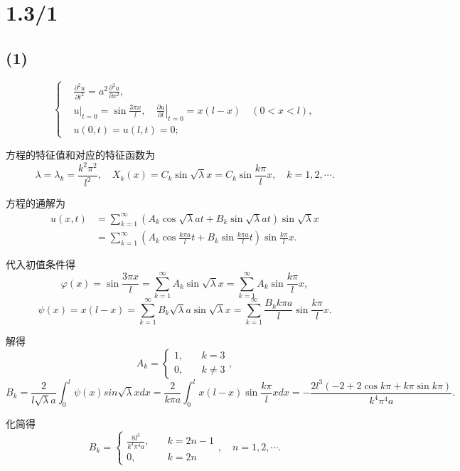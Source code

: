 \documentclass[11pt,a4paper]{article}
\author{刘逸灏 (515370910207)}
\begin{document}
\maketitle

\section{1.3/1}

\subsection*{(1)}

$$
  \left\{\begin{aligned}
     & \frac{\partial^2u}{\partial t^2}=a^2\frac{\partial^2u}{\partial x^2},                                      \\
     & u|_{t=0}=\sin\frac{3\pi x}{l},\quad \left.\frac{\partial u}{\partial t}\right|_{t=0}=x(l-x) \quad (0<x<l), \\
     & u(0,t)=u(l,t)=0;
  \end{aligned}\right.
$$

方程的特征值和对应的特征函数为
$$\lambda=\lambda_k=\frac{k^2\pi^2}{l^2},\quad X_k(x)=C_k\sin\sqrt{\lambda}x=C_k\sin\frac{k\pi}{l}x,\quad k=1,2,\cdots.$$

方程的通解为
\begin{align*}
  u(x,t)
   & =\sum_{k=1}^\infty\left(A_k\cos\sqrt{\lambda}at+
  B_k\sin\sqrt{\lambda}at\right)\sin\sqrt{\lambda}x    \\
   & =\sum_{k=1}^\infty\left(A_k\cos\frac{k\pi a}{l}t+
  B_k\sin\frac{k\pi a}{l}t\right)\sin\frac{k\pi}{l}x.
\end{align*}

代入初值条件得
$$\varphi(x)=\sin\frac{3\pi x}{l}=\sum_{k=1}^\infty A_k\sin\sqrt{\lambda}x=\sum_{k=1}^\infty A_k\sin\frac{k\pi }{l}x,$$
$$\psi(x)=x(l-x)=\sum_{k=1}^\infty B_k\sqrt{\lambda}a\sin\sqrt{\lambda}x=\sum_{k=1}^\infty \frac{B_kk\pi a}{l}\sin\frac{k\pi}{l}x.$$

解得
$$A_k=\left\{\begin{aligned}1, &\quad k = 3 \\ 0, &\quad k\neq 3 \end{aligned}\right.,$$
$$B_k=\frac{2}{l\sqrt{\lambda}a}\int_0^l\psi(x)sin\sqrt{\lambda}xdx=
  \frac{2}{k\pi a}\int_0^l x(l-x)\sin\frac{k\pi}{l}xdx=-\frac{2l^3(-2+2\cos k\pi+k\pi\sin k\pi)}{k^4\pi^4a}.$$

化简得
$$B_k=\left\{\begin{aligned}\frac{8l^3}{k^4\pi^4a}, &\quad k = 2n-1 \\ 0, &\quad k=2n \end{aligned}\right.,\quad n=1,2,\cdots.$$
\end{document}
